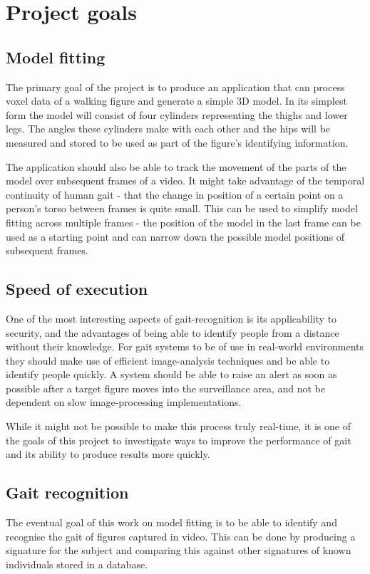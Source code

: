 \section{Project goals}

\subsection{Model fitting}
\label{Goals:ModelFitting}

The primary goal of the project is to produce an application that can process voxel data of a walking figure and generate a simple 3D model.
In its simplest form the model will consist of four cylinders representing the thighs and lower legs.
The angles these cylinders make with each other and the hips will be measured and stored to be used as part of the figure's identifying information.

The application should also be able to track the movement of the parts of the model over subsequent frames of a video.
It might take advantage of the temporal continuity of human gait - that the change in position of a certain point on a person's torso between frames is quite small.
This can be used to simplify model fitting across multiple frames -
the position of the model in the last frame can be used as a starting point and can narrow down the possible model positions of subsequent frames.


\subsection{Speed of execution}

One of the most interesting aspects of gait-recognition is its applicability to security, and the advantages of being able to identify people from a distance without their knowledge.
For gait systems to be of use in real-world environments they should make use of efficient image-analysis techniques and be able to identify people quickly.
A system should be able to raise an alert as soon as possible after a target figure moves into the surveillance area, and not be dependent on slow image-processing implementations.

While it might not be possible to make this process truly real-time, it is one of the goals of this project to investigate ways to improve the performance of gait and its ability to produce results more quickly.


\subsection{Gait recognition}

The eventual goal of this work on model fitting is to be able to identify and recognise the gait of figures captured in video.
This can be done by producing a signature for the subject and comparing this against other signatures of known individuals stored in a database.

